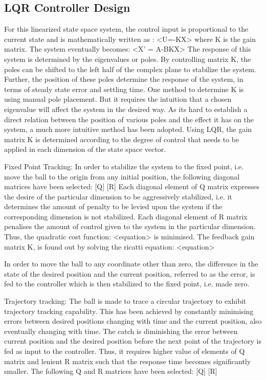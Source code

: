 \documentclass[conference]{IEEEtran}
\begin{document}
\subsection*{LQR Controller Design}
For this linearized state space system, the control input is proportional to the current state and is mathematically written as : <U=-KX> where K is the gain matrix.
The system eventually becomes: <X’ = A-BKX>
The response of this system is determined by the eigenvalues or poles. By controlling matrix K, the poles can be shifted to the left half of the complex plane to stabilize the system. Further, the position of these poles determine the response of the system, in terms of steady state error and settling time.
One method to determine K is using manual pole placement. But it requires the intuition that a chosen eigenvalue will affect the system in the desired way. As its hard to establish a direct relation between the position of various poles and the effect it has on the system, a much more intuitive method has been adopted. Using LQR, the gain matrix K is determined according to the degree of control that needs to be applied in each dimension of the state space vector.

Fixed Point Tracking: In order to stabilize the system to the fixed point, i.e. move the ball to the origin from any initial position, the following diagonal matrices have been selected:
[Q] [R]
Each diagonal element of Q matrix expresses the desire of the particular dimension to be aggressively stabilized, i.e. it determines the amount of penalty to be levied upon the system if the corresponding dimension is not stabilized. Each diagonal element of R matrix penalises the amount of control given to the system in the particular dimension. Thus, the quadratic cost function: <equation>  is minimised. 
The feedback gain matrix K, is found out by solving the ricatti equation: <equation>

In order to move the ball to any coordinate other than zero, the difference in the state of the desired position and the current position, referred to as the error, is fed to the controller which is then stabilized to the fixed point, i.e. made zero.

Trajectory tracking: The ball is made to trace a circular trajectory to exhibit trajectory tracking capability. This has been achieved by constantly minimising errors between desired positions changing with time and the current position, also eventually changing with time. The catch is diminishing the error between current position and the desired position before the next point of the trajectory is fed as input to the controller. Thus, it requires higher value of elements of Q matrix and lenient R matrix such that the response time becomes significantly smaller. The following Q and R matrices have been selected: [Q] [R]
\end{document}
